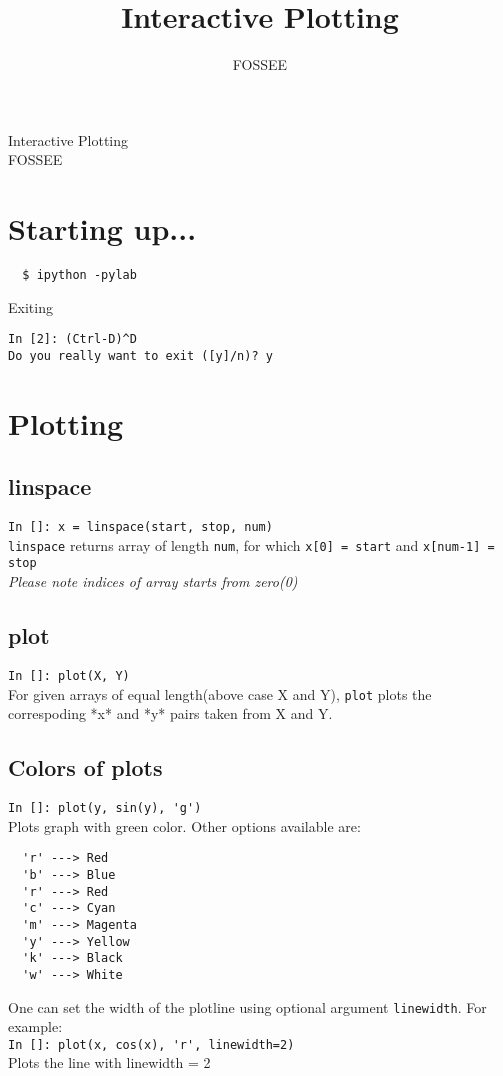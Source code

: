 \documentclass[12pt]{article}
\title{Interactive Plotting}
\author{FOSSEE}
\newcommand{\typ}[1]{\lstinline{#1}}
\begin{document}
\date{}
\vspace{-1in}
\begin{center}
\LARGE{Interactive Plotting}\\
\large{FOSSEE}
\end{center}
\section{Starting up...}

\begin{lstlisting}
  $ ipython -pylab  
\end{lstlisting}
Exiting 
\begin{lstlisting}     
In [2]: (Ctrl-D)^D
Do you really want to exit ([y]/n)? y
\end{lstlisting} %

\section{Plotting}
\subsection{linspace}
\typ{In []: x = linspace(start, stop, num)}\\
\typ{linspace} returns array of length \typ{num}, for which \typ{x[0] = start} and \typ{x[num-1] = stop} \\
\emph{Please note indices of array starts from zero(0)}

\subsection{plot}
\typ{In []: plot(X, Y)}\\
For given arrays of equal length(above case X and Y), \typ{plot} plots the correspoding *x* and *y* pairs taken from X and Y.

\subsection{Colors of plots}
\typ{In []: plot(y, sin(y), 'g')}\\
Plots graph with green color. Other options available are:
\begin{lstlisting}
  'r' ---> Red
  'b' ---> Blue
  'r' ---> Red 
  'c' ---> Cyan 
  'm' ---> Magenta
  'y' ---> Yellow
  'k' ---> Black 
  'w' ---> White
\end{lstlisting}
One can set the width of the plotline using optional argument \typ{linewidth}. For example:\\
\typ{In []: plot(x, cos(x), 'r', linewidth=2)}\\
Plots the line with linewidth = 2
\end{document}
